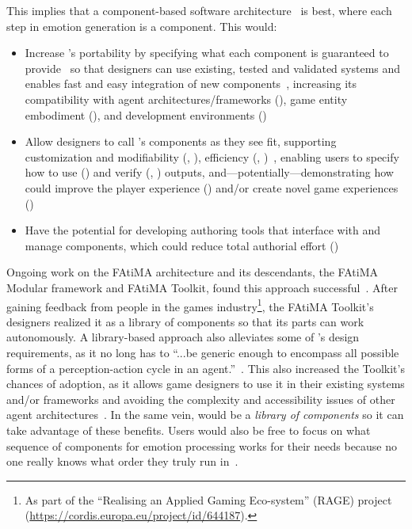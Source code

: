 This implies that a component-based software 
architecture~\citep[p.~248--261]{qian2010software} is best, where each step in 
emotion generation is a component. This would:
\begin{itemize}
    \item Increase \progname{}'s portability by specifying what each component 
    is guaranteed to provide~\citep[p.~254]{qian2010software} so that designers 
    can use existing, tested and validated systems and enables fast and easy 
    integration of new components~\citep[p.~443]{rodriguez2015computational}, 
    increasing its compatibility with agent architectures/frameworks 
    (), game entity embodiment (), and 
    development environments ()

    \item Allow designers to call \progname{}'s components as they see fit,     
    supporting customization and modifiability (, 
    ), efficiency (, 
    )~\citep[p.~466]{carbone2020radically}, enabling users 
    to specify how to use () and verify (, 
    ) \progname{} outputs, and---potentially---demonstrating how 
    \progname{} could improve the player experience () and/or 
    create novel game experiences ()

    \item Have the potential for developing authoring tools that interface with 
    and manage \progname{} components, which could reduce total authorial 
    effort ()
\end{itemize}

Ongoing work on the FAtiMA architecture and its descendants, the FAtiMA Modular 
framework and FAtiMA Toolkit, found this approach 
successful~\citep[p.~8:2, 8:12--8:13]{mascarenhas2022fatima}. After gaining 
feedback from people in the games industry\footnote{As part of the ``Realising 
an Applied Gaming Eco-system'' (RAGE) project 
(\url{https://cordis.europa.eu/project/id/644187}).}, the FAtiMA Toolkit's 
designers realized it as a library of components so that its parts can work 
autonomously. A library-based approach also alleviates some of \progname{}'s 
design requirements, as it no long has to ``...be generic enough to encompass 
all possible forms of a perception-action cycle in an 
agent.''~\citep[p.~8:12]{mascarenhas2022fatima}. This also increased the 
Toolkit's chances of adoption, as it allows game designers to use it in their 
existing systems and/or frameworks and avoiding the complexity and 
accessibility issues of other agent 
architectures~\citep[p.~3]{guimaraes2022fatima}. In the same vein, \progname{} 
would be a \textit{library of components} so it can take advantage of these 
benefits. Users would also be free to focus on what sequence of components for 
emotion processing works for their needs because no one really knows what order 
they truly run in~\citep[p.~142]{moffat1997personality}.

